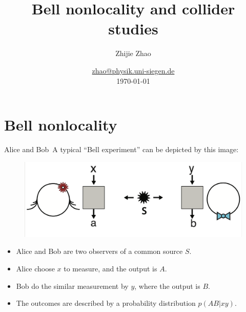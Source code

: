 \documentclass{beamer}
\title{Bell nonlocality and collider \\ studies}
\author{Zhijie Zhao}
\date{\href{mailto:zhao@physik.uni-siegen.de}{zhao@physik.uni-siegen.de} \\ \today}
\begin{document}
    \maketitle

    \section{Bell nonlocality}

    \begin{frame}{Alice and Bob}{\thesection \, \secname}
        A typical ``Bell experiment'' can be depicted by this image:
        \begin{figure}[htbp]
            \centering
            \includegraphics[width=.75\linewidth]{img/alice-and-bob.png}
        \end{figure}
        \begin{center}
            \footnotesize {}
        \end{center}
        \begin{itemize}
            \item Alice and Bob are two observers of a common source $S$.
            \item Alice choose $x$ to measure, and the output is $A$.
            \item Bob do the similar measurement by $y$, where the output is $B$.
            \item The outcomes are described by a probability distribution $p(AB|xy)$.
        \end{itemize}
    \end{frame}
\end{document}
